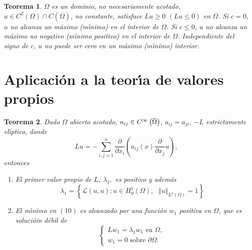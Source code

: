 \documentclass{article}
\newtheorem{theorem}{Teorema}
\begin{document}
\begin{theorem}
$\Omega $ es un dominio, no necesariamente acotado, $u\in C^{2}\left( \Omega
\right) \cap C\left( \overline{\Omega }\right) $, no constante, satisface $%
Lu\geq 0$ $\left( Lu\leq 0\right) $ en $\Omega $. Si $c=0$, $u$ no alcanza
un m\'{a}ximo (m\'{\i}nimo) en el interior de $\Omega $. Si $c\leq 0$, $u$
no alcanza un m\'{a}ximo no negativo (m\'{\i}nimo positivo) en el interior
de $\Omega $. Independiente del signo de $c$, $u$ no puede ser cero en un
m\'{a}ximo (m\'{\i}nimo) interior.
\end{theorem}

\section{Aplicaci\'{o}n a la teor\'{\i}a de valores propios}

\begin{theorem}
Dado $\Omega $ abierto acotado, $a_{ij}\in C^{\infty }\left( \overline{%
\Omega }\right) $, $a_{ij}=a_{ji}$, $-L$ estrictamente el\'{\i}ptico, donde 
\begin{equation*}
Lu=-\sum_{i,j=1}^{n}\frac{\partial }{\partial x_{i}}\left( a_{ij}\left(
x\right) \frac{\partial }{\partial x_{j}}u\right) ,
\end{equation*}
entonces

\begin{enumerate}
\item[$a)$]  El primer valor propio de $L$, $\lambda _{1},$ es positivo y
adem\'{a}s 
\begin{equation}
\lambda _{1}=\left\{ \mathcal{L}\left( u,u\right) :u\in H_{0}^{1}\left(
\Omega \right) ,\text{ }\left\Vert u\right\Vert _{L^{2}\left( \Omega \right)
}=1\right\}  \tag{10}
\end{equation}

\item[$b)$]  El m\'{\i}nimo en $\left( 10\right) $ es alcanzado por una
funci\'{o}n $w_{1}$ positiva en $\Omega $, que es soluci\'{o}in d\'{e}bil de 
\begin{equation}
\left\{ 
\begin{array}{c}
Lw_{1}=\lambda _{1}w_{1}\text{ \ en }\Omega , \\ 
w_{1}=0\text{ \ sobre }\partial \Omega .
\end{array}
\right.  \tag{11}
\end{equation}
\end{enumerate}
\end{theorem}
\end{document}
